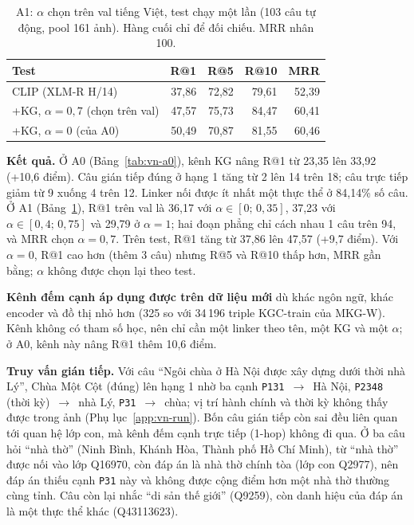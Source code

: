 \begin{table}[t]
\centering
\caption{A1: $\alpha$ chọn trên val tiếng Việt, test chạy một lần (103 câu tự động, pool 161 ảnh). Hàng cuối chỉ
để đối chiếu. MRR nhân 100.}
\label{tab:vn-a1}
\footnotesize
\begin{tabular}{@{}lrrrr@{}}
\toprule
Test & R@1 & R@5 & R@10 & MRR \\
\midrule
CLIP (XLM-R H/14) & 37,86 & 72,82 & 79,61 & 52,39 \\
+KG, $\alpha=0{,}7$ (chọn trên val) & 47,57 & 75,73 & 84,47 & 60,41 \\
+KG, $\alpha=0$ (của A0) & 50,49 & 70,87 & 81,55 & 60,46 \\
\bottomrule
\end{tabular}
\end{table}

\textbf{Kết quả.} Ở A0 (Bảng~\ref{tab:vn-a0}), kênh KG nâng R@1 từ 23,35 lên 33,92 (+10,6 điểm). Câu gián tiếp đúng ở hạng 1
tăng từ 2 lên 14 trên 18; câu trực tiếp giảm từ 9 xuống 4 trên 12. Linker nối được ít nhất một thực thể ở 84,14\% số câu. Ở
A1 (Bảng~\ref{tab:vn-a1}), R@1 trên val là 36,17 với $\alpha \in [0;\,0{,}35]$, 37,23 với $\alpha \in [0{,}4;\,0{,}75]$ và
29,79 ở $\alpha=1$; hai đoạn phẳng chỉ cách nhau 1 câu trên 94, và MRR chọn $\alpha=0{,}7$. Trên test, R@1 tăng từ 37,86 lên
47,57 (+9,7 điểm). Với $\alpha=0$, R@1 cao hơn (thêm 3 câu) nhưng R@5 và R@10 thấp hơn, MRR gần bằng; $\alpha$ không được
chọn lại theo test.

\textbf{Kênh đếm cạnh áp dụng được trên dữ liệu mới} dù khác ngôn ngữ, khác encoder và đồ thị nhỏ hơn (325 so với 34\,196
triple KGC-train của MKG-W). Kênh không có tham số học, nên chỉ cần một linker theo tên, một KG và một $\alpha$; ở A0, kênh
này nâng R@1 thêm 10,6 điểm.\label{sec:vn-analysis}

\textbf{Truy vấn gián tiếp.} Với câu ``Ngôi chùa ở Hà Nội được xây dựng dưới thời nhà Lý'', Chùa Một Cột (đúng) lên hạng 1
nhờ ba cạnh \texttt{P131}~$\rightarrow$~Hà Nội, \texttt{P2348} (thời kỳ)~$\rightarrow$~nhà Lý, \texttt{P31}~$\rightarrow$~chùa;
vị trí hành chính và thời kỳ không thấy được trong ảnh (Phụ lục~\ref{app:vn-run}). Bốn câu gián tiếp còn sai đều liên quan
tới quan hệ lớp con, mà kênh đếm cạnh trực tiếp (1-hop) không đi qua. Ở ba câu hỏi ``nhà thờ'' (Ninh Bình, Khánh Hòa, Thành
phố Hồ Chí Minh), từ ``nhà thờ'' được nối vào lớp Q16970, còn đáp án là nhà thờ chính tòa (lớp con Q2977), nên đáp án thiếu
cạnh \texttt{P31} này và không được cộng điểm hơn một nhà thờ thường cùng tỉnh. Câu còn lại nhắc ``di sản thế giới''
(Q9259), còn danh hiệu của đáp án là một thực thể khác (Q43113623).

